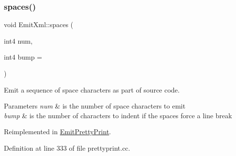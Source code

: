 \subsubsection{\texorpdfstring{spaces()}{spaces()}}
{\footnotesize\ttfamily void Emit\+Xml\+::spaces (\begin{DoxyParamCaption}\item[{int4}]{num,  }\item[{int4}]{bump = {} }\end{DoxyParamCaption})\hspace{0.3cm}{\ttfamily [virtual]}}



Emit a sequence of space characters as part of source code. 


\begin{DoxyParams}{Parameters}
{\em num} & is the number of space characters to emit \\
\hline
{\em bump} & is the number of characters to indent if the spaces force a line break \\
\hline
\end{DoxyParams}


Reimplemented in \mbox{\hyperlink{class_emit_pretty_print_aef02e9261ce7b7a96bceeae169512a3f}{Emit\+Pretty\+Print}}.



Definition at line 333 of file prettyprint.\+cc.

